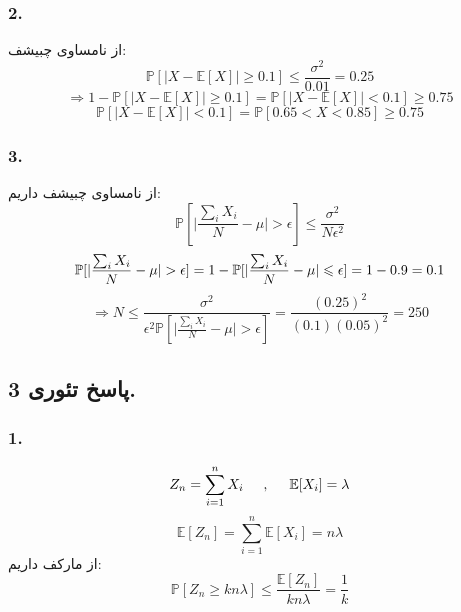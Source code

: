 \documentclass[]{article}
\begin{document}
	\subsubsection{2.}
	از نامساوی چبیشف:
	\begin{equation}
		\nonumber
		\mathbb{P}[|X - \mathbb{E}[X]| \geqslant 0.1] \leqslant \frac{\sigma^2}{0.01} = 0.25
	\end{equation}
	\begin{equation}
		\nonumber
		\Rightarrow 1- \mathbb{P}[|X - \mathbb{E}[X]| \geqslant 0.1] = \mathbb{P}[|X - \mathbb{E}[X]| < 0.1] \geqslant 0.75
	\end{equation}
	\begin{equation}
		\nonumber
		\mathbb{P}[|X - \mathbb{E}[X]| < 0.1] = \mathbb{P}[0.65 < X < 0.85] \geqslant 0.75
	\end{equation}
	\subsubsection{3.}
	از نامساوی چبیشف داریم:
	\begin{equation}
		\nonumber
		\mathbb{P}[\lvert \frac{\sum_{i}X_i}{N} - \mu \rvert > \epsilon] \leqslant \frac{\sigma ^ 2}{N \epsilon^2}
	\end{equation}
	\begin{equation}
		\nonumber
		\mathbb{P}[\lvert \frac{\sum_{i}X_i}{N} - \mu \rvert > \epsilon] = 1 -  \mathbb{P}[\lvert \frac{\sum_{i}X_i}{N} - \mu \rvert \leqslant \epsilon] \\ = 1- 0.9 = 0.1
	\end{equation}
	\begin{equation}
		\nonumber
		\Rightarrow N \leqslant \frac{\sigma^2}{\epsilon^2 \mathbb{P}[\lvert \frac{\sum_{i}X_i}{N} - \mu \rvert > \epsilon]} = \frac{(0.25) ^ 2}{(0.1) (0.05) ^ 2} = 250
	\end{equation}
	\newpage
	\subsection{پاسخ تئوری 3.}
	\subsubsection{1.}
	\begin{equation}
		\nonumber
		Z_n = \sum_{i=1}^{n} X_i \hspace{0.5cm} , \hspace{0.5cm} \mathbb{E}[X_i] = \lambda
	\end{equation}
	\begin{equation}
		\nonumber
		\mathbb{E}[Z_n] = \sum_{i=1}^{n} \mathbb{E}[X_i] = n\lambda
	\end{equation}
	از مارکف داریم:
	\begin{equation}
		\nonumber
		\mathbb{P}[Z_n \geqslant kn\lambda] \leqslant \frac{\mathbb{E}[Z_n]}{kn\lambda} = \frac{1}{k}
	\end{equation}
\end{document}
